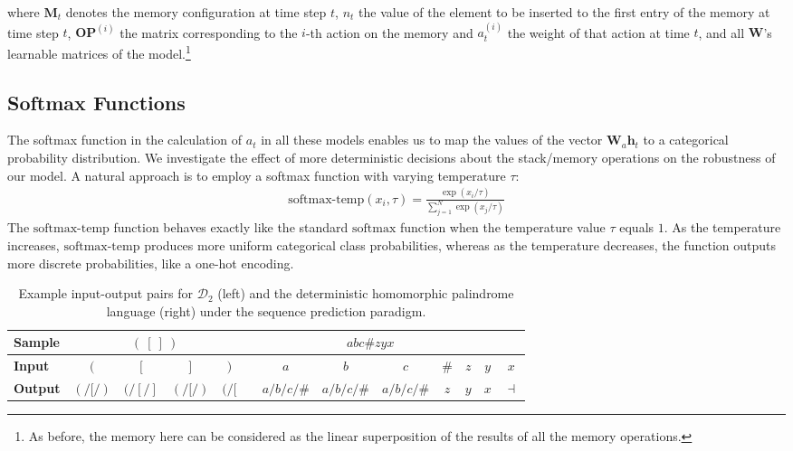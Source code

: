 \documentclass[11pt,a4paper]{article}
\theoremstyle{plain}
\newcommand{\weight}[1] {\mathbf{W}_{#1}}
\newcommand{\hidden}[1] {\mathbf{h}_{#1}}
\newcommand{\dyck}[1]{\ensuremath{\mathcal{D}_{#1}}}
\begin{document}
\noindent where $\mathbf{M}_{t}$ denotes the memory configuration at time step $t$, $n_t$ the value of the element to be inserted to the first entry of the memory at time step $t$, $\mathbf{OP}^{(i)}$ the matrix corresponding to the $i$-th action on the memory
and $a_t ^{(i)}$ the weight of that action at time $t$, and all $\mathbf{W}$'s learnable matrices of the model.\footnote{As before, the memory here can be considered as the linear superposition of the results of all the memory operations.}

\subsection{Softmax Functions}
The softmax function in the calculation of $a_t$ in all these models enables us to map the values of the vector $\weight{a} \hidden{t}$ to a categorical probability distribution. We investigate the effect of more deterministic decisions about the stack/memory operations on the robustness of our model. A natural approach is to employ a softmax function with varying temperature $\tau$: 
\vspace{-0.7em}
\begin{align*}
    \text{softmax-temp}(x_{i}, \tau) = \frac{\exp(x_i/\tau)}{\sum_{j=1}^{N} \exp(x_j/\tau)}
\label{eqn:softmax-temp}
\end{align*}
The $\text{softmax-temp}$ function behaves exactly like the standard $\text{softmax}$ function when the temperature value $\tau$ equals $1$. As the temperature increases, $\text{softmax-temp}$ produces more uniform categorical class probabilities, whereas as the temperature decreases, the function outputs more discrete probabilities, like a one-hot encoding.

\begin{table}[t]
\centering
\begin{tabular}{l | cccc | cccccccc}
\toprule
 \bf Sample & \multicolumn{4}{c|}{$( \ [ \ ] \ )$} & \multicolumn{7}{c}{$abc\#zyx$} \\ 
 \midrule
 \bf  Input &  $($&$[$&$]$&$)$& & $ a$&$b$&$c$&$\#$&$z$&$y$&$x$ \\ 
 \bf Output & $(/[/)$&$(/[/]$&$(/[/)$&$(/[$& & 
 $a/b/c/\#$&$a/b/c/\#$&$a/b/c/\#$&$z$&$y$&$x$&$\dashv$ \\ 
\bottomrule
\end{tabular}
\caption{Example input-output pairs for \dyck{2} (left) and the deterministic homomorphic palindrome language (right) under the sequence prediction paradigm.}
\label{tab:examples}
\vspace{-10pt}
\end{table}
\end{document}
